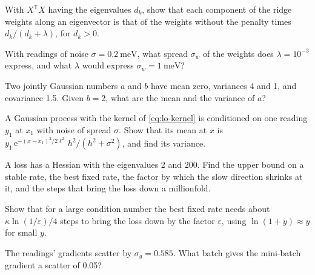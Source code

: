 \begin{exercise}[shrinkage]
\label{ex:lo-shrink}
With $X^{\mathsf T}X$ having the eigenvalues $d_k$, show that each
component of the ridge weights along an eigenvector is that of the
weights without the penalty times $d_k/(d_k + \lambda)$, for $d_k > 0$.
\end{exercise}

\begin{exercise}
\label{ex:lo-prior}
With readings of noise $\sigma = \SI{0.2}{\milli\electronvolt}$, what
spread $\sigma_w$ of the weights does $\lambda = 10^{-3}$ express, and
what $\lambda$ would express $\sigma_w = \SI{1}{\milli\electronvolt}$?
\end{exercise}

\begin{exercise}
\label{ex:lo-condition}
Two jointly Gaussian numbers $a$ and $b$ have mean zero, variances 4 and
1, and covariance 1.5. Given $b = 2$, what are the mean and the variance
of $a$?
\end{exercise}

\begin{exercise}
\label{ex:lo-one}
A Gaussian process with the kernel of \cref{eq:lo-kernel} is conditioned
on one reading $y_1$ at $x_1$ with noise of spread $\sigma$. Show that
its mean at $x$ is $y_1\,\mathrm{e}^{-(x - x_1)^2/2\ell^2}\,h^2/(h^2 +
\sigma^2)$, and find its variance.
\end{exercise}

\begin{exercise}
\label{ex:lo-rate}
A loss has a Hessian with the eigenvalues 2 and 200. Find the upper
bound on a stable rate, the best fixed rate, the factor by which the slow direction
shrinks at it, and the steps that bring the loss down a millionfold.
\end{exercise}

\begin{exercise}
\label{ex:lo-kappa}
Show that for a large condition number the best fixed rate needs about
$\kappa\ln(1/\varepsilon)/4$ steps to bring the loss down by the factor
$\varepsilon$, using $\ln(1 + y) \approx y$ for small $y$.
\end{exercise}

\begin{exercise}
\label{ex:lo-batch}
The readings' gradients scatter by $\sigma_g = 0.585$. What batch gives
the mini-batch gradient a scatter of 0.05?
\end{exercise}

